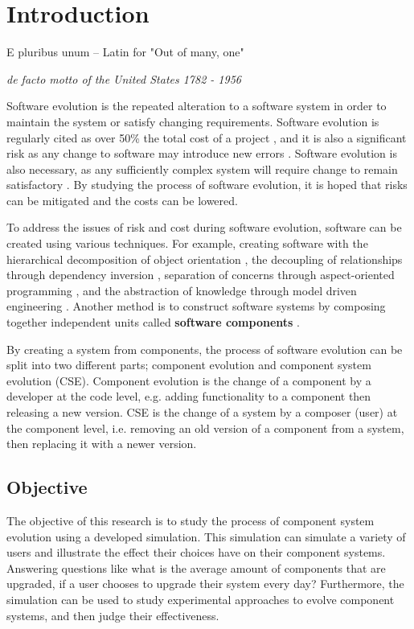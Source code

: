 \chapter{Introduction}
\label{introduction}
\epigraph{E pluribus unum -- Latin for "Out of many, one"}
{\textit{de facto motto of the United States 1782 - 1956}}
Software evolution is the repeated alteration to a software system in order to maintain the system or satisfy changing requirements.
Software evolution is regularly cited as over 50\% the total cost of a project \citep{Grubb2003},
and it is also a significant risk as any change to software may introduce new errors \citep{Brooks1975}.
Software evolution is also necessary, as any sufficiently complex system will require change to remain satisfactory \citep{lehman1980}. 
By studying the process of software evolution, it is hoped that risks can be mitigated and the costs can be lowered.

To address the issues of risk and cost during software evolution, software can be created using various techniques.
For example, creating software with the hierarchical decomposition of object orientation \citep{goldberg1983smalltalk}, 
the decoupling of relationships through dependency inversion \citep{martin1996dependency}, 
separation of concerns through aspect-oriented programming \citep{Kiczales1997},
and the abstraction of knowledge through model driven engineering \citep{schmidt2006}.
Another method is to construct software systems by composing together independent units called \textbf{software components} \citep{Szyperski2002}.

By creating a system from components, the process of software evolution can be split into two different parts;
component evolution and component system evolution (CSE).
Component evolution is the change of a component by a developer at the code level,
e.g. adding functionality to a component then releasing a new version.  
CSE is the change of a system by a composer (user) at the component level,
i.e. removing an old version of a component from a system, then replacing it with a newer version.

\section{Objective}
The objective of this research is to study the process of component system evolution using a developed simulation.
This simulation can simulate a variety of users and illustrate the effect their choices have on their component systems.
Answering questions like what is the average amount of components that are upgraded, if a user chooses to upgrade their system every day?
Furthermore, the simulation can be used to study experimental approaches to evolve component systems, and then judge their effectiveness.

